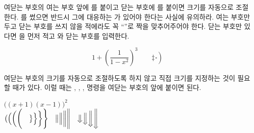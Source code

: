 여닫는 부호의 여는 부호 앞에 를 붙이고 닫는 부호에 를 붙이면 
 크기를 자동으로 조절한다. 를 썼으면 반드시 그에 대응하는 가 
있어야 한다는 사실에 유의하라. 여는 부호만 두고 닫는 부호를 쓰지 않을 적에라도 꼭 ``''로
짝을 맞추어주어야 한다. 닫는 부호만 있다면 을 먼저 적고 와 닫는 부호를 입력한다.
\begin{example}
\begin{equation*}
1 + \left(\frac{1}{1-x^{2}}
    \right)^3 \qquad 
\left. \ddagger \frac{~}{~}\right)
\end{equation*}
\end{example}

여닫는 부호의 크기를 자동으로 조절하도록 하지 않고 직접 크기를 지정하는 것이 필요할 때가 있다.
이럴 때는 , , ,  명령을 여닫는 부호의 앞에 붙이면 된다.

\begin{example}
$\Big((x+1)(x-1)\Big)^{2}$\\
$\big( \Big( \bigg( \Bigg( \quad
\big\} \Big\} \bigg\} \Bigg\} \quad
\big\| \Big\| \bigg\| \Bigg\| \quad
\big\Downarrow \Big\Downarrow 
\bigg\Downarrow \Bigg\Downarrow$
\end{example}


